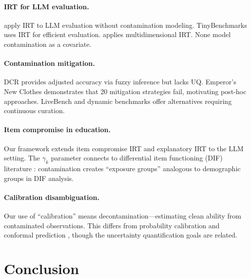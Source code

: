 \documentclass[11pt]{article}
\begin{document}
\paragraph{IRT for LLM evaluation.} \citet{lalor2024irt} apply IRT to LLM evaluation without contamination modeling. TinyBenchmarks \citep{polo2024tinybenchmarks} uses IRT for efficient evaluation. \citet{burnell2023revealing} applies multidimensional IRT. None model contamination as a covariate.

\paragraph{Contamination mitigation.} DCR \citep{oren2024proving} provides adjusted accuracy via fuzzy inference but lacks UQ. Emperor's New Clothes \citep{xu2025emperor} demonstrates that 20 mitigation strategies fail, motivating post-hoc approaches. LiveBench \citep{white2024livebench} and dynamic benchmarks offer alternatives requiring continuous curation.

\paragraph{Item compromise in education.} Our framework extends item compromise IRT \citep{eckerly2017detecting,sinharay2017detection} and explanatory IRT \citep{deboeck2004explanatory} to the LLM setting. The $\gamma_k$ parameter connects to differential item functioning (DIF) literature \citep{holland1993differential}: contamination creates ``exposure groups'' analogous to demographic groups in DIF analysis.

\paragraph{Calibration disambiguation.} Our use of ``calibration'' means decontamination---estimating clean ability from contaminated observations. This differs from probability calibration \citep{guo2017calibration,platt1999probabilistic} and conformal prediction \citep{angelopoulos2023conformal}, though the uncertainty quantification goals are related.

\section{Conclusion}
\end{document}
